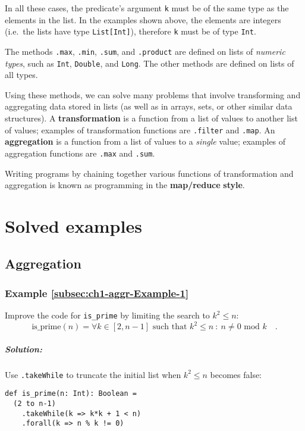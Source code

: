 In all these cases, the predicate's argument \lstinline!k! must be
of the same type as the elements in the list. In the examples shown
above, the elements are integers (i.e.\ the lists have type \lstinline!List[Int]!),
therefore \texttt{}\lstinline!k! must be of type \lstinline!Int!.

The methods \lstinline!.max!, \lstinline!.min!, \lstinline!.sum!,
and \texttt{}\lstinline!.product! are defined on lists of \emph{numeric
types}, such as \lstinline!Int!, \lstinline!Double!, and \lstinline!Long!.
The other methods are defined on lists of all types.

Using these methods, we can solve many problems that involve transforming
and aggregating data stored in lists (as well as in arrays, sets,
or other similar data structures). A \textbf{transformation}
is a function from a list of values to another list of values; examples
of transformation functions are \texttt{}\lstinline!.filter! and
\lstinline!.map!. An \textbf{aggregation} is
a function from a list of values to a \emph{single} value; examples
of aggregation functions are \texttt{}\lstinline!.max! and \lstinline!.sum!.

Writing programs by chaining together various functions of transformation
and aggregation is known as programming in the \textbf{map/reduce}
\textbf{style}.

\section{Solved examples}

\subsection{Aggregation }

\subsubsection{Example \label{subsec:ch1-aggr-Example-1}\ref{subsec:ch1-aggr-Example-1}}

Improve the code for \lstinline!is_prime! by limiting the search
to $k^{2}\leq n$:
\[
\text{is\_prime}\left(n\right)=\forall k\in\left[2,n-1\right]\text{ such that }k^{2}\leq n\ :\ n\neq0\text{ mod }k\quad.
\]


\subparagraph{Solution:}

Use \lstinline!.takeWhile! to truncate the initial list when $k^{2}\leq n$
becomes false:
\begin{lstlisting}
def is_prime(n: Int): Boolean =
  (2 to n-1)
    .takeWhile(k => k*k + 1 < n)
    .forall(k => n % k != 0)
\end{lstlisting}



